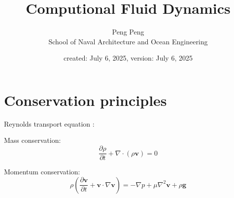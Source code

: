\documentclass{article}
\title{Computional Fluid Dynamics}
\author{Peng Peng \\ \small School of Naval Architecture and Ocean Engineering}
\date{created: July 6, 2025, version: July 6, 2025}
\begin{document}
\maketitle
\tableofcontents
\section{Conservation principles}
Reynolds transport equation \autocite{bird_2015_-IntroductoryTransportPhenomena}:

Mass conservation:
\begin{equation}
  \label{eq:continuity equation}
  \frac{\partial \rho}{\partial t} + \nabla \cdot (\rho \boldsymbol{v}) = 0
\end{equation}

Momentum conservation:
\begin{equation}
  \label{eq:momentum conservation}
  \rho \left( \frac{\partial \boldsymbol{v}}{\partial t} + \boldsymbol{v} \cdot \nabla \boldsymbol{v} \right) = -\nabla p + \mu\nabla^{2} \boldsymbol{v} + \rho \boldsymbol{g}
\end{equation}

\printbibliography
\end{document}
